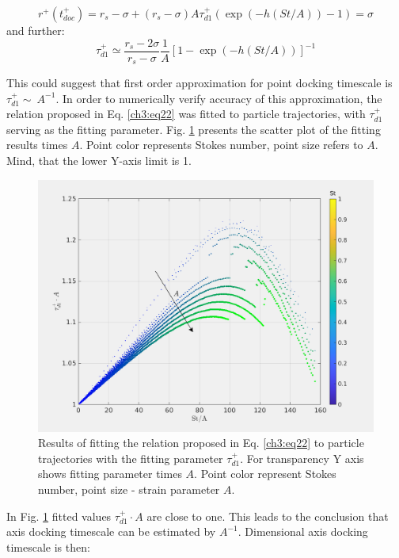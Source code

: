 \documentclass[../main.tex]{subfiles}
\begin{document}
\begin{equation}
r^+(t^+_{doc})=r_s-\sigma+(r_s-\sigma)A\tau^+_{d1} (\exp\left(-h\left(St/A\right)\right)-1)=\sigma
\label{ch3:eq24}
\end{equation}
and further:
\begin{equation}
\tau^+_{d1} \simeq \frac{r_s-2\sigma}{r_s-\sigma} \frac{1}{A} \left[1-\exp\left(-h\left(St/A\right)\right)\right]^{-1}
\label{ch3:eq25}
\end{equation}

This could suggest that first order approximation for point docking timescale is $\tau^+_{d1} \sim \ A^{-1}$. In order to numerically verify accuracy of this approximation, the relation proposed in Eq. \ref{ch3:eq22} was fitted to particle trajectories, with $\tau^+_{d1}$ serving as the fitting parameter. Fig. \ref{fig:ch3_45} presents the scatter plot of the fitting results times $A$. Point color represents Stokes number, point size refers to $A$. Mind, that the lower Y-axis limit is 1.

\begin{figure}
\centering
\noindent \includegraphics[width=30pc]{gfx/point_docking_taud1A_vs_St_A.png}
\caption{Results of fitting the relation proposed in Eq. \ref{ch3:eq22} to particle trajectories with the fitting parameter $\tau^+_{d1}$. For transparency Y axis shows fitting parameter times $A$. Point color represent Stokes number, point size - strain parameter $A$.}
\label{fig:ch3_45}
\end{figure}
In Fig. \ref{fig:ch3_45} fitted values $\tau^+_{d1} \cdot A$ are close to one. This leads to the conclusion that axis docking timescale can be estimated by $A^{-1}$. Dimensional axis docking timescale is then:
\end{document}

